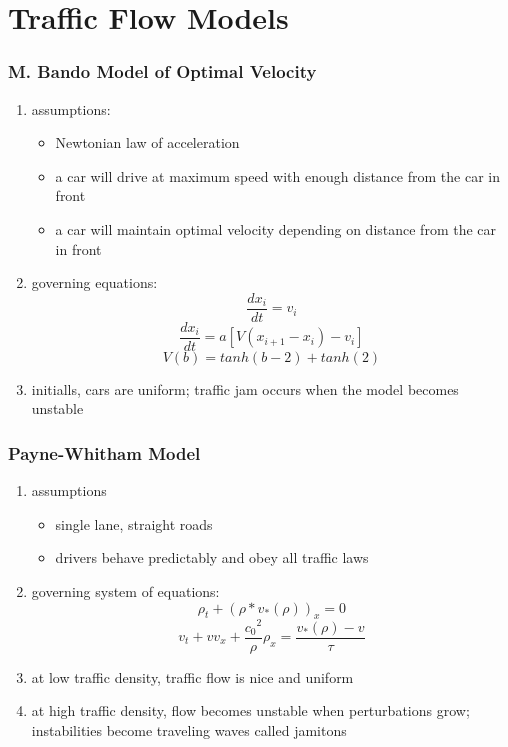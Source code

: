 \documentclass[compress,handout,10pt]{beamer}
\let\olditem\item
\renewcommand{\item}{\setlength{\itemsep}{0.5\baselineskip}\olditem}
\begin{document}
\section{Traffic Flow Models}
\begin{frame}
    \frametitle{M. Bando Model of Optimal Velocity}
     \begin{enumerate}
	\item assumptions:
		\begin{itemize}
			\item Newtonian law of acceleration
			\item a car will drive at maximum speed with enough distance from the car in front
			\item a car will maintain optimal velocity depending on distance from the car in front
		\end{itemize}
	\item governing equations:
	\[
	\frac{dx_i}{dt} = v_i
	\]
	\[
	\frac{dx_i}{dt} = a[V(x_{i+1} - x_i) - v_i]
	\]
	\[
	V(b) = tanh(b-2) + tanh(2)
	\]
	\item initialls, cars are uniform; traffic jam occurs when the model becomes unstable
     \end{enumerate}
\end{frame}

\begin{frame}
    \frametitle{Payne-Whitham Model}
     \begin{enumerate}
	\item assumptions
	\begin{itemize}
		\item single lane, straight roads
		\item drivers behave predictably and obey all traffic laws
	\end{itemize}
	\item governing system of equations:
	\[
	\rho_t + (\rho*v_*(\rho))_x = 0 
	\]
	\[
	v_t + vv_x + \frac{{c_0}^2}{\rho}\rho_x = \frac{v_*(\rho) - v}{\tau}
	\]
	\item at low traffic density, traffic flow is nice and uniform
	\item at high traffic density, flow becomes unstable when perturbations grow; instabilities become traveling waves called jamitons
     \end{enumerate}
\end{frame}
\end{document}
